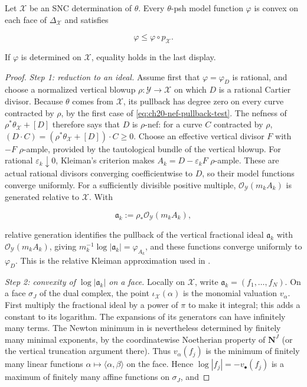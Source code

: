 \begin{lemma}\label{lem:ch21-model-skeletal-properties}
Let $\mathcal X$ be an SNC determination of $\theta$.  Every
$\theta$-psh model function $\varphi$ is convex on each face of
$\Delta_{\mathcal X}$ and satisfies

\[
                 \varphi\leq\varphi\circ p_{\mathcal X}.
\]

If $\varphi$ is determined on $\mathcal X$, equality holds in the last
display.
\end{lemma}

\begin{proof}
\emph{Step 1: reduction to an ideal.}  Assume first that
$\varphi=\varphi_D$ is rational, and choose a normalized
vertical blowup
$\rho:\mathcal Y\to\mathcal X$ on which $D$ is a rational Cartier
divisor.  Because
$\theta$ comes from $\mathcal X$, its pullback has degree zero on every
curve contracted by $\rho$, by the first case of
\eqref{eq:ch20-nef-pullback-test}.  The nefness of
$\rho^*\theta_{\mathcal X}+[D]$ therefore says that $D$ is
$\rho$-nef: for a curve $C$ contracted by $\rho$,
$(D\cdot C)=(\rho^*\theta_{\mathcal X}+[D])\cdot C\geq0$.  Choose an effective vertical divisor $F$ with $-F$ $\rho$-ample,
provided by the tautological bundle of the vertical blowup.  For rational
$\varepsilon_k\downarrow0$, Kleiman's criterion makes
$A_k=D-\varepsilon_kF$ $\rho$-ample.  These are actual rational divisors
converging coefficientwise to $D$, so their model functions converge
uniformly.  For a sufficiently divisible positive multiple, $\mathcal O_{\mathcal Y}(m_kA_k)$ is generated relative to
$\mathcal X$.  With

\[
       \mathfrak a_k:=\rho_*
          \mathcal O_{\mathcal Y}(m_kA_k),
\]

relative generation identifies the pullback of the vertical
fractional ideal $\mathfrak a_k$ with
$\mathcal O_{\mathcal Y}(m_kA_k)$, giving
$m_k^{-1}\log|\mathfrak a_k|=\varphi_{A_k}$, and these functions converge
uniformly to $\varphi_D$.  This is the relative Kleiman approximation used
in \cite[\S5.2]{BFJ16}.

\emph{Step 2: convexity of $\log|\mathfrak a_k|$ on a face.}  Locally on
$\mathcal X$, write $\mathfrak a_k=(f_1,\ldots,f_N)$.  On a face
$\sigma_J$ of the dual complex, the point $\iota_{\mathcal X}(\alpha)$
is the monomial valuation $v_\alpha$.
First multiply the fractional ideal by a power of $\pi$ to make it
integral; this adds a constant to its logarithm.  The expansions of its
generators can have infinitely many terms.  The Newton minimum in
 is nevertheless determined by finitely many
minimal exponents, by the coordinatewise Noetherian property of
$\mathbf N^J$ (or the vertical truncation argument there).  Thus
$v_\alpha(f_j)$ is the minimum of finitely many linear functions
$\alpha\mapsto\langle\alpha,\beta\rangle$ on the face.  Hence
$\log|f_j|=-v_\bullet(f_j)$ is a maximum of finitely many affine
functions on $\sigma_J$, and


\end{proof}
